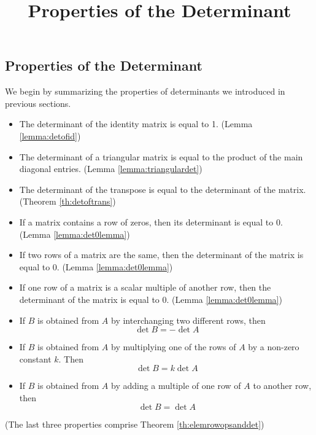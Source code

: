 \documentclass{ximera}
\title{Properties of the Determinant} \license{CC BY-NC-SA 4.0}
\begin{document}
\begin{abstract}
 \end{abstract}
\maketitle

\begin{onlineOnly}
\section*{Properties of the Determinant}
\end{onlineOnly}

We begin by summarizing the properties of determinants we introduced in previous sections.

\begin{summary}
\begin{itemize}
\item The determinant of the identity matrix is equal to 1. (Lemma \ref{lemma:detofid})
\item The determinant of a triangular matrix is equal to the product of the main diagonal entries. (Lemma \ref{lemma:triangulardet})
\item The determinant of the transpose is equal to the determinant of the matrix. (Theorem \ref{th:detoftrans})
\item If a matrix contains a row of zeros, then its determinant is equal to 0. (Lemma \ref{lemma:det0lemma})
\item If two rows of a matrix are the same, then the determinant of the matrix is equal to 0.  (Lemma \ref{lemma:det0lemma})
\item If one row of a matrix is a scalar multiple of another row, then the determinant of the matrix is equal to 0. (Lemma \ref{lemma:det0lemma})

\item
If $B$ is obtained from $A$ by interchanging two different rows, then $$\det{B}=-\det{A}$$
\item 
If $B$ is obtained from $A$ by multiplying one of the rows of $A$ by a non-zero constant $k$.  Then $$\det{B}=k\det{A}$$
\item 
If $B$ is obtained from $A$ by adding a multiple of one row of $A$ to another row, then
$$\det{B}=\det{A}$$
\end{itemize}
(The last three properties comprise Theorem \ref{th:elemrowopsanddet})
\end{summary}
\end{document}
